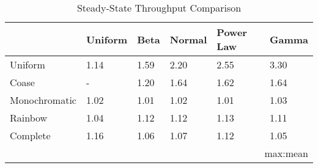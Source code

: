 \begin{table*}[t!]
\centering
\caption{Steady-State Throughput Comparison}
\begin{tabular}{llllll}
\toprule
{}    &  Uniform & Beta &  Normal &  Power Law &   Gamma \\
\midrule
Uniform  &  1.14    & 1.59 &  2.20   &   2.55     &  3.30 \\
Coase &  -       & 1.20 &  1.64   &   1.62     &  1.64 \\
Monochromatic & 1.02 &  1.01 &  1.02  &    1.01 &  1.03 \\
Rainbow       & 1.04 &  1.12 &  1.12  &    1.13 &  1.11 \\
Complete      & 1.16 &  1.06 &  1.07  &    1.12 &  1.05 \\
\bottomrule
\multicolumn{6}{r}{max:mean} 
\end{tabular}
\label{tab:load_distritubtion}
\end{table*}
